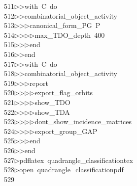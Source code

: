 \begin{tabbing}
511\>$\triangleright$\>$\triangleright$\>with\ C\ do\ \\[0pt]
512\>$\triangleright$\>$\triangleright$\>combinatorial\_object\_activity\ \\[0pt]
513\>$\triangleright$\>$\triangleright$\>$\triangleright$\>canonical\_form\_PG\ P\ \\[0pt]
514\>$\triangleright$\>$\triangleright$\>$\triangleright$\>$\triangleright$\>max\_TDO\_depth\ 400\ \\[0pt]
515\>$\triangleright$\>$\triangleright$\>$\triangleright$\>end\ \\[0pt]
516\>$\triangleright$\>$\triangleright$\>end\ \\[0pt]
517\>$\triangleright$\>$\triangleright$\>with\ C\ do\ \\[0pt]
518\>$\triangleright$\>$\triangleright$\>combinatorial\_object\_activity\ \\[0pt]
519\>$\triangleright$\>$\triangleright$\>$\triangleright$\>report\ \\[0pt]
520\>$\triangleright$\>$\triangleright$\>$\triangleright$\>$\triangleright$\>export\_flag\_orbits\ \\[0pt]
521\>$\triangleright$\>$\triangleright$\>$\triangleright$\>$\triangleright$\>show\_TDO\ \\[0pt]
522\>$\triangleright$\>$\triangleright$\>$\triangleright$\>$\triangleright$\>show\_TDA\ \\[0pt]
523\>$\triangleright$\>$\triangleright$\>$\triangleright$\>$\triangleright$\>dont\_show\_incidence\_matrices\ \\[0pt]
524\>$\triangleright$\>$\triangleright$\>$\triangleright$\>$\triangleright$\>export\_group\_GAP\ \\[0pt]
525\>$\triangleright$\>$\triangleright$\>$\triangleright$\>end\ \\[0pt]
526\>$\triangleright$\>$\triangleright$\>end\\[0pt]
527\>$\triangleright$\>pdflatex\ quadrangle\_classificationtex\\[0pt]
528\>$\triangleright$\>open\ quadrangle\_classificationpdf\\[0pt]
529\>\\[0pt]

\end{tabbing}
